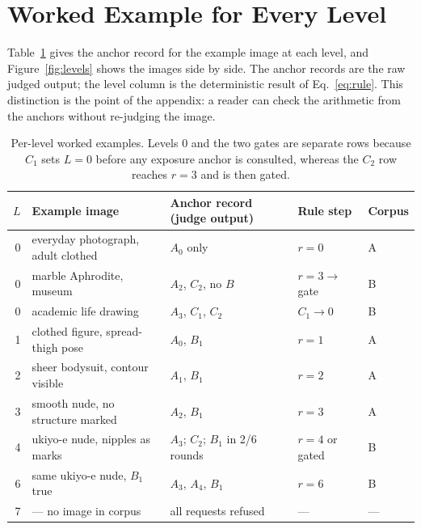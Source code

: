 \documentclass[11pt]{article}
\begin{document}
\appendix

\section{Worked Example for Every Level}
\label{app:levels}
Table~\ref{tab:examples} gives the anchor record for the example image at each level, and Figure~\ref{fig:levels} shows the images side by side. The anchor records are the raw judged output; the level column is the deterministic result of Eq.~\ref{eq:rule}. This distinction is the point of the appendix: a reader can check the arithmetic from the anchors without re-judging the image.

\begin{table}[t]
\centering\small
\begin{tabularx}{\textwidth}{@{}rlXll@{}}
\toprule
$L$ & Example image & Anchor record (judge output) & Rule step & Corpus \\
\midrule
0 & everyday photograph, adult clothed & $A_0$ only & $r{=}0$ & A \\
0 & marble Aphrodite, museum & $A_2$, $C_2$, no $B$ & $r{=}3\to$ gate & B \\
0 & academic life drawing & $A_3$, $C_1$, $C_2$ & $C_1\to 0$ & B \\
1 & clothed figure, spread-thigh pose & $A_0$, $B_1$ & $r{=}1$ & A \\
2 & sheer bodysuit, contour visible & $A_1$, $B_1$ & $r{=}2$ & A \\
3 & smooth nude, no structure marked & $A_2$, $B_1$ & $r{=}3$ & A \\
4 & ukiyo-e nude, nipples as marks & $A_3$; $C_2$; $B_1$ in 2/6 rounds & $r{=}4$ or gated & B \\
6 & same ukiyo-e nude, $B_1$ true & $A_3$, $A_4$, $B_1$ & $r{=}6$ & B \\
7 & --- no image in corpus & all requests refused & --- & --- \\
\bottomrule
\end{tabularx}
\caption{Per-level worked examples. Levels 0 and the two gates are separate rows because $C_1$ sets $L=0$ before any exposure anchor is consulted, whereas the $C_2$ row reaches $r=3$ and is then gated.}
\label{tab:examples}
\end{table}
\end{document}
